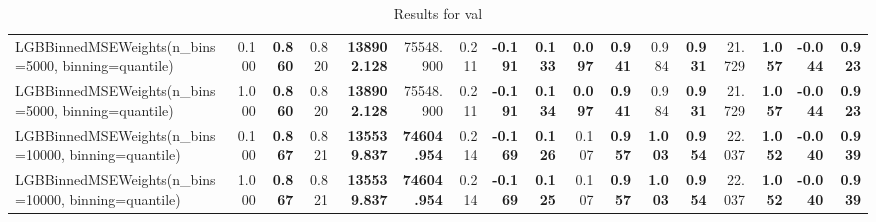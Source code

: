 \documentclass[11pt]{article}
\theoremstyle{plain}
\theoremstyle{definition}
\newcommand{\1}{\mathbf{1}}
\begin{document}
\begin{table}[htbp]
{\begin{tabular}{lrrrrrrrrrrrrrrrr}
LGBBinnedMSEWeights(n_bins=5000, binning=quantile) & 0.100 & \textbf{0.860} & 0.820 & \textbf{138902.128} & 75548.900 & 0.211 & \textbf{-0.191} & \textbf{0.133} & \textbf{0.097} & \textbf{0.941} & 0.984 & \textbf{0.931} & 21.729 & \textbf{1.057} & \textbf{-0.044} & \textbf{0.923} \\
LGBBinnedMSEWeights(n_bins=5000, binning=quantile) & 1.000 & \textbf{0.860} & 0.820 & \textbf{138902.128} & 75548.900 & 0.211 & \textbf{-0.191} & \textbf{0.134} & \textbf{0.097} & \textbf{0.941} & 0.984 & \textbf{0.931} & 21.729 & \textbf{1.057} & \textbf{-0.044} & \textbf{0.923} \\
LGBBinnedMSEWeights(n_bins=10000, binning=quantile) & 0.100 & \textbf{0.867} & 0.821 & \textbf{135539.837} & \textbf{74604.954} & 0.214 & \textbf{-0.169} & \textbf{0.126} & 0.107 & \textbf{0.957} & \textbf{1.003} & \textbf{0.954} & 22.037 & \textbf{1.052} & \textbf{-0.040} & \textbf{0.939} \\
LGBBinnedMSEWeights(n_bins=10000, binning=quantile) & 1.000 & \textbf{0.867} & 0.821 & \textbf{135539.837} & \textbf{74604.954} & 0.214 & \textbf{-0.169} & \textbf{0.125} & 0.107 & \textbf{0.957} & \textbf{1.003} & \textbf{0.954} & 22.037 & \textbf{1.052} & \textbf{-0.040} & \textbf{0.939} \\
\bottomrule
\end{tabular}
     }
    \caption{Results for val}
    \label{tab:results_val}
\end{table}
\end{document}
